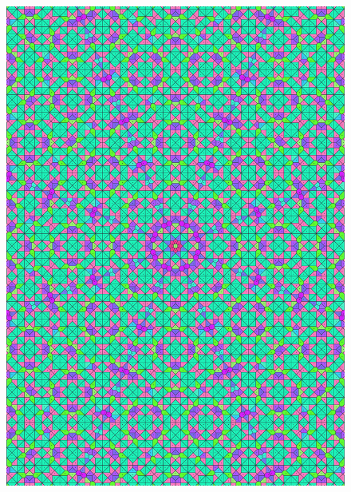 \documentclass[text.tex]{subfiles}
\begin{document}
\begin{figure}[h!]
\centering
\includegraphics[width=1\textwidth]{img/results/octagon/quasi_polygon-octagon_100000_(1_0alpha_1).pdf}
\end{figure}
\end{document}

